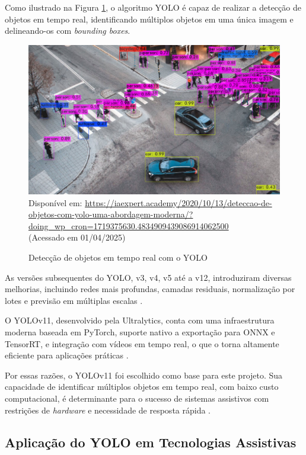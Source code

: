 Como ilustrado na Figura \ref{fg2}, o algoritmo YOLO é capaz de realizar a detecção de objetos em tempo real, identificando múltiplos objetos em uma única imagem e delineando-os com \textit{bounding boxes}.

\begin{figure}[htbp]
  \centering
  \caption{Detecção de objetos em tempo real com o YOLO}
  \includegraphics[width=1\textwidth]{Figuras/detec-yolo.png}
  \\
  Disponível em: \url{https://iaexpert.academy/2020/10/13/deteccao-de-objetos-com-yolo-uma-abordagem-moderna/?doing_wp_cron=1719375630.4834909439086914062500 } \\(Acessado em 01/04/2025)
  \label{fg2}
\end{figure}

As versões subsequentes do YOLO, v3, v4, v5 até a v12, introduziram diversas melhorias, incluindo redes mais profundas, camadas residuais, normalização por lotes e previsão em múltiplas escalas \cite{bochkovskiy2020}.

O YOLOv11, desenvolvido pela Ultralytics, conta com uma infraestrutura moderna baseada em PyTorch, suporte nativo a exportação para ONNX e TensorRT, e integração com vídeos em tempo real, o que o torna altamente eficiente para aplicações práticas \cite{Ultralytics2024}.

Por essas razões, o YOLOv11 foi escolhido como base para este projeto. Sua capacidade de identificar múltiplos objetos em tempo real, com baixo custo computacional, é determinante para o sucesso de sistemas assistivos com restrições de \textit{hardware} e necessidade de resposta rápida \cite{bochkovskiy2020}.

\subsection{Aplicação do YOLO em Tecnologias Assistivas}


